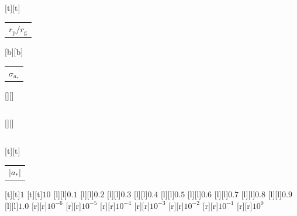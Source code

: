 %    
%
%
\begin{psfrags}%
\psfragscanon%
%
[t][t]{\color[rgb]{0,0,0}\setlength{\tabcolsep}{0pt}\begin{tabular}{c}{\Large$r_\mathrm{p}/r_\mathrm{g}$}\end{tabular}}%
[b][b]{\color[rgb]{0,0,0}\setlength{\tabcolsep}{0pt}\begin{tabular}{c}{\Large$\sigma_{a_\ast}$}\end{tabular}}%
[][]{\color[rgb]{0,0,0}\setlength{\tabcolsep}{0pt}\begin{tabular}{c} \end{tabular}}%
[][]{\color[rgb]{0,0,0}\setlength{\tabcolsep}{0pt}\begin{tabular}{c} \end{tabular}}%
[t][t]{\color[rgb]{0,0,0}\setlength{\tabcolsep}{0pt}\begin{tabular}{c}{\Large$\left|a_\ast\right|$}\end{tabular}}%
%
[t][t]{$1$}%
[t][t]{$10$}%
%
[l][l]{$0.1$}%
[l][l]{$0.2$}%
[l][l]{$0.3$}%
[l][l]{$0.4$}%
[l][l]{$0.5$}%
[l][l]{$0.6$}%
[l][l]{$0.7$}%
[l][l]{$0.8$}%
[l][l]{$0.9$}%
[l][l]{$1.0$}%
[r][r]{$10^{-6}$}%
[r][r]{$10^{-5}$}%
[r][r]{$10^{-4}$}%
[r][r]{$10^{-3}$}%
[r][r]{$10^{-2}$}%
[r][r]{$10^{-1}$}%
[r][r]{$10^{0}$}%
%
%
\end{psfrags}%
%
